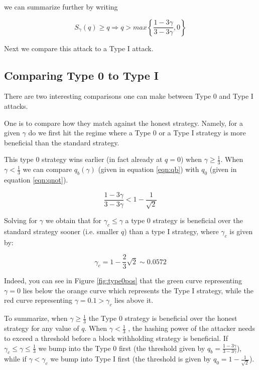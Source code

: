 \documentclass[letterpaper,12pt]{report}
\theoremstyle{plain}
\theoremstyle{definition}
\begin{document}
we can summarize further by writing

\begin{equation}\label{eqn:0overhonestsummary}
S_{\gamma}(q)\geq q \Longrightarrow
q>max\left\lbrace\dfrac{1-3\gamma}{3-3\gamma},0\right\rbrace
\end{equation}

Next we compare this attack to a Type I attack.

\subsection{Comparing Type 0 to Type I}

There are two interesting comparisons one can make between Type 0 and Type I attacks.

One is to compare how they match against the honest strategy. Namely, for a given $\gamma$ do we first hit the regime where a Type 0 or a Type I strategy is more beneficial than the standard strategy.

This type 0 strategy wins earlier (in fact already at $q=0$) when $\gamma\geq\frac{1}{3}$. When $\gamma < \frac{1}{3}$ we can compare $q_b(\gamma)$ (given in equation \ref{eqn:qb}) with $q_0$ (given in equation \ref{eqn:qnot}).

\begin{equation}\label{eqn:qbornot}
\dfrac{1-3\gamma}{3-3\gamma}<1-\dfrac{1}{\sqrt{2}}
\end{equation}

Solving for $\gamma$ we obtain that for  $\gamma_c\leq\gamma$ a type 0 strategy is beneficial over the standard strategy sooner (i.e. smaller $q$) than a type I strategy, where $\gamma_c$ is given by:

\begin{equation}\label{gamma0before1}
\gamma_c=1-\frac{2}{3}\sqrt{2}\sim 0.0572
\end{equation}

Indeed, you can see in Figure \ref{fig:type0pos} that the green curve representing $\gamma=0$ lies below the orange curve which represents the Type I strategy, while the red curve representing $\gamma=0.1>\gamma_c$ lies above it.

To summarize, when $\gamma\geq\frac{1}{3}$ the Type 0 strategy is beneficial over the honest strategy for any value of $q$. When $\gamma<\frac{1}{3}$ , the hashing power of the attacker needs to exceed a threshold before a block withholding strategy is beneficial. If $\gamma_c\leq\gamma\leq\frac{1}{3}$ we bump into the Type 0 first (the threshold given by $q_b=\frac{1-3\gamma}{3-3\gamma}$), while if $\gamma<\gamma_c$ we bump into Type I first (the threshold is given by $q_0=1-\frac{1}{\sqrt{2}}$).
\end{document}
